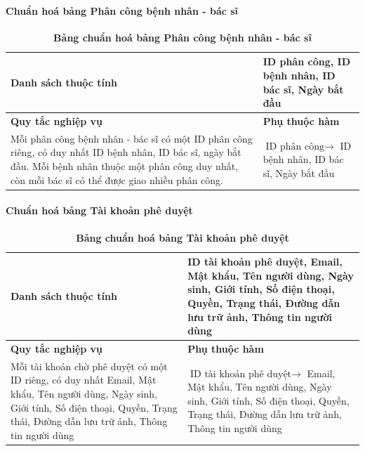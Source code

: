 \paragraph{Chuẩn hoá bảng Phân công bệnh nhân - bác sĩ}
\mbox{}
\begin{table}[H]
  \caption{\bfseries \fontsize{12pt}{0pt}\selectfont Bảng chuẩn hoá bảng Phân công bệnh nhân - bác sĩ}
  \centering
  \begin{tabularx}{0.9\textwidth}{|X|X|}
    \hline
    \textbf{Danh sách thuộc tính} & ID phân công, ID bệnh nhân, ID bác sĩ, Ngày bắt đầu \\
    \hline
    \textbf{Quy tắc nghiệp vụ} & \textbf{Phụ thuộc hàm} \\
    \hline
    Mỗi phân công bệnh nhân - bác sĩ có một ID phân công riêng, có duy nhất ID bệnh nhân, ID bác sĩ, ngày bắt đầu.
    Mỗi bệnh nhân thuộc một phân công duy nhất, còn mỗi bác sĩ có thể được giao nhiều phân công.
    & \parbox[t]{\linewidth}{$\text{ID phân công} \rightarrow$ ID bệnh nhân, ID bác sĩ, Ngày bắt đầu} \\
    \hline
     \\
     \\
    \hline
  \end{tabularx}
\end{table}

\paragraph{Chuẩn hoá bảng Tài khoản phê duyệt}
\mbox{}
\begin{table}[H]
  \caption{\bfseries \fontsize{12pt}{0pt}\selectfont Bảng chuẩn hoá bảng Tài khoản phê duyệt}
  \centering
  \begin{tabularx}{0.9\textwidth}{|X|X|}
    \hline
    \textbf{Danh sách thuộc tính} & ID tài khoản phê duyệt, Email, Mật khẩu, Tên người dùng, Ngày sinh, Giới tính, Số điện thoại, Quyền, Trạng thái, Đường dẫn lưu trữ ảnh, Thông tin người dùng \\
    \hline
    \textbf{Quy tắc nghiệp vụ} & \textbf{Phụ thuộc hàm} \\
    \hline
    Mỗi tài khoản chờ phê duyệt có một ID riêng, có duy nhất Email, Mật khẩu, Tên người dùng, Ngày sinh, Giới tính,
     Số điện thoại, Quyền, Trạng thái, Đường dẫn lưu trữ ảnh, Thông tin người dùng 
    & \parbox[t]{\linewidth}{$\text{ID tài khoản phê duyệt} \rightarrow$ Email, Mật khẩu, Tên người dùng, Ngày sinh, Giới tính,
    Số điện thoại, Quyền, Trạng thái, Đường dẫn lưu trữ ảnh, Thông tin người dùng} \\
    \hline
     \\
     \\
    \hline
  \end{tabularx}
\end{table}

